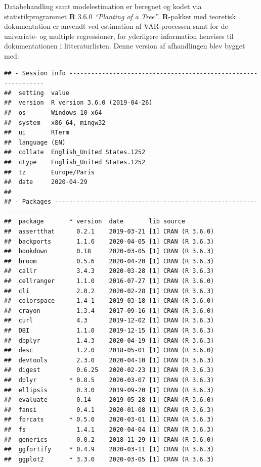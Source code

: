 \documentclass[
  a4paper,
  oneside]{memoir}
\begin{document}
Databehandling samt modelestimation er beregnet og kodet via statistikprogrammet \textbf{R} 3.6.0 \emph{``Planting of a Tree''}. \textbf{R}-pakker med teoretisk dokumentation er anvendt ved estimation af VAR-processen samt for de univariate- og multiple regressioner, for yderligere information henvises til dokumentationen i litteraturlisten. Denne version af afhandlingen blev bygget med:

\begin{verbatim}
## - Session info ---------------------------------------------------------------
##  setting  value                       
##  version  R version 3.6.0 (2019-04-26)
##  os       Windows 10 x64              
##  system   x86_64, mingw32             
##  ui       RTerm                       
##  language (EN)                        
##  collate  English_United States.1252  
##  ctype    English_United States.1252  
##  tz       Europe/Paris                
##  date     2020-04-29                  
## 
## - Packages -------------------------------------------------------------------
##  package       * version  date       lib source           
##  assertthat      0.2.1    2019-03-21 [1] CRAN (R 3.6.0)   
##  backports       1.1.6    2020-04-05 [1] CRAN (R 3.6.3)   
##  bookdown        0.18     2020-03-05 [1] CRAN (R 3.6.3)   
##  broom           0.5.6    2020-04-20 [1] CRAN (R 3.6.3)   
##  callr           3.4.3    2020-03-28 [1] CRAN (R 3.6.3)   
##  cellranger      1.1.0    2016-07-27 [1] CRAN (R 3.6.0)   
##  cli             2.0.2    2020-02-28 [1] CRAN (R 3.6.3)   
##  colorspace      1.4-1    2019-03-18 [1] CRAN (R 3.6.0)   
##  crayon          1.3.4    2017-09-16 [1] CRAN (R 3.6.0)   
##  curl            4.3      2019-12-02 [1] CRAN (R 3.6.3)   
##  DBI             1.1.0    2019-12-15 [1] CRAN (R 3.6.3)   
##  dbplyr          1.4.3    2020-04-19 [1] CRAN (R 3.6.3)   
##  desc            1.2.0    2018-05-01 [1] CRAN (R 3.6.0)   
##  devtools        2.3.0    2020-04-10 [1] CRAN (R 3.6.3)   
##  digest          0.6.25   2020-02-23 [1] CRAN (R 3.6.3)   
##  dplyr         * 0.8.5    2020-03-07 [1] CRAN (R 3.6.3)   
##  ellipsis        0.3.0    2019-09-20 [1] CRAN (R 3.6.3)   
##  evaluate        0.14     2019-05-28 [1] CRAN (R 3.6.0)   
##  fansi           0.4.1    2020-01-08 [1] CRAN (R 3.6.3)   
##  forcats       * 0.5.0    2020-03-01 [1] CRAN (R 3.6.3)   
##  fs              1.4.1    2020-04-04 [1] CRAN (R 3.6.3)   
##  generics        0.0.2    2018-11-29 [1] CRAN (R 3.6.0)   
##  ggfortify     * 0.4.9    2020-03-11 [1] CRAN (R 3.6.3)   
##  ggplot2       * 3.3.0    2020-03-05 [1] CRAN (R 3.6.3)   

\end{verbatim}
\end{document}
